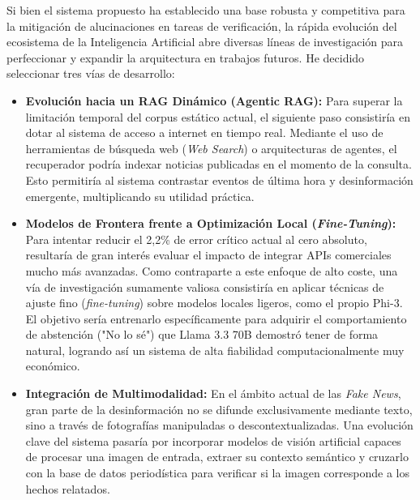 Si bien el sistema propuesto ha establecido una base robusta y competitiva para la mitigación de alucinaciones en tareas de verificación, la rápida evolución del ecosistema de la Inteligencia Artificial abre diversas líneas de investigación para perfeccionar y expandir la arquitectura en trabajos futuros. He decidido seleccionar tres vías de desarrollo:

\begin{itemize}
    \item \textbf{Evolución hacia un RAG Dinámico (Agentic RAG):} Para superar la limitación temporal del corpus estático actual, el siguiente paso consistiría en dotar al sistema de acceso a internet en tiempo real. Mediante el uso de herramientas de búsqueda web (\textit{Web Search}) o arquitecturas de agentes, el recuperador podría indexar noticias publicadas en el momento de la consulta. Esto permitiría al sistema contrastar eventos de última hora y desinformación emergente, multiplicando su utilidad práctica.

    \item \textbf{Modelos de Frontera frente a Optimización Local (\textit{Fine-Tuning}):} Para intentar reducir el 2,2\% de error crítico actual al cero absoluto, resultaría de gran interés evaluar el impacto de integrar APIs comerciales mucho más avanzadas. Como contraparte a este enfoque de alto coste, una vía de investigación sumamente valiosa consistiría en aplicar técnicas de ajuste fino (\textit{fine-tuning}) sobre modelos locales ligeros, como el propio Phi-3. El objetivo sería entrenarlo específicamente para adquirir el comportamiento de abstención ("No lo sé") que Llama 3.3 70B demostró tener de forma natural, logrando así un sistema de alta fiabilidad computacionalmente muy económico.

    \item \textbf{Integración de Multimodalidad:} En el ámbito actual de las \textit{Fake News}, gran parte de la desinformación no se difunde exclusivamente mediante texto, sino a través de fotografías manipuladas o descontextualizadas. Una evolución clave del sistema pasaría por incorporar modelos de visión artificial capaces de procesar una imagen de entrada, extraer su contexto semántico y cruzarlo con la base de datos periodística para verificar si la imagen corresponde a los hechos relatados.
\end{itemize}